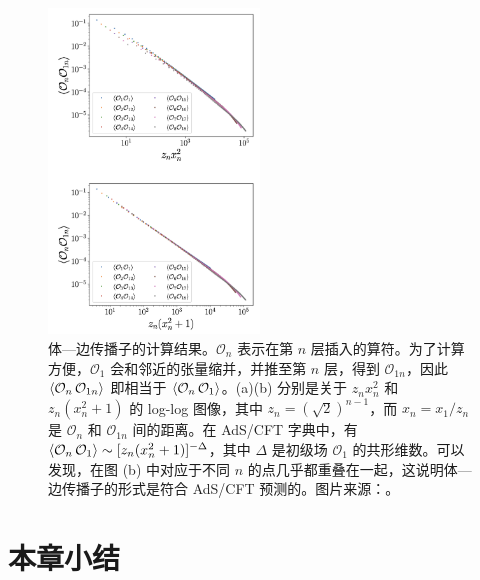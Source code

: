 \begin{figure}[htb]
  \centering
  \includegraphics[width=0.5\textwidth]{images/holographic/bulk-boundary-propagator.png}
  \caption[体—边传播子的计算结果]{体—边传播子的计算结果。$\mathcal{O}_n$ 表示在第 $n$ 层插入的算符。为了计算方便，$\mathcal{O}_1$ 会和邻近的张量缩并，并推至第 $n$ 层，得到 $\mathcal{O}_{1n}$，因此 $\ev{\mathcal{O}_n\,\mathcal{O}_{1n}}$ 即相当于 $\ev{\mathcal{O}_n\,\mathcal{O}_1}$。(a)(b) 分别是关于 $z_n x_n^2$ 和 $z_n(x_n^2+1)$ 的 log-log 图像，其中 $z_n=(\sqrt{2})^{n-1}$，而 $x_n=x_1/z_n$ 是 $\mathcal{O}_n$ 和 $\mathcal{O}_{1n}$ 间的距离。在 AdS/CFT 字典中，有 $\ev{\mathcal{O}_n\,\mathcal{O}_1}\sim[z_n(x_n^2+1)]^{-\Delta}$，其中 $\Delta$ 是初级场 $\mathcal{O}_1$ 的共形维数。可以发现，在图 (b) 中对应于不同 $n$ 的点几乎都重叠在一起，这说明体—边传播子的形式是符合 AdS/CFT 预测的。图片来源：\parencite{chen2022exact}。}
  \label{fig:bulk-boundary-propagator}
\end{figure}


\section{本章小结}
